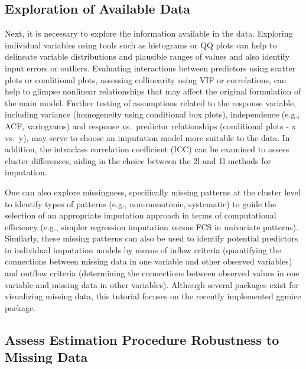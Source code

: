 \documentclass[
  article]{jss}
\begin{document}
\hypertarget{exploration-of-available-data}{%
\subsection{Exploration of Available
Data}\label{exploration-of-available-data}}

Next, it is necessary to explore the information available in the data.
Exploring individual variables using tools such as histograms or QQ
plots can help to delineate variable distributions and plausible ranges
of values and also identify input errors or outliers. Evaluating
interactions between predictors using scatter plots or conditional
plots, assessing collinearity using VIF or correlations, can help to
glimpse nonlinear relationships that may affect the original formulation
of the main model. Further testing of assumptions related to the
response variable, including variance (homogeneity using conditional box
plots), independence (e.g., ACF, variograms) and response vs.~predictor
relationships (conditional plots - x vs.~y), may serve to choose an
imputation model more suitable to the data. In addition, the intraclass
correlation coefficient (ICC) can be examined to assess cluster
differences, aiding in the choice between the 2l and 1l methods for
imputation.

One can also explore missingness, specifically missing patterns at the
cluster level to identify types of patterns (e.g., non-monotonic,
systematic) to guide the selection of an appropriate imputation approach
in terms of computational efficiency (e.g., simpler regression
imputation versus FCS in univariate patterns). Similarly, these missing
patterns can also be used to identify potential predictors in individual
imputation models by means of inflow criteria (quantifying the
connections between missing data in one variable and other observed
variables) and outflow criteria (determining the connections between
observed values in one variable and missing data in other variables).
Although several packages exist for visualizing missing data, this
tutorial focuses on the recently implemented ggmice package.

\hypertarget{assess-estimation-procedure-robustness-to-missing-data}{%
\subsection{Assess Estimation Procedure Robustness to Missing
Data}\label{assess-estimation-procedure-robustness-to-missing-data}}
\end{document}
